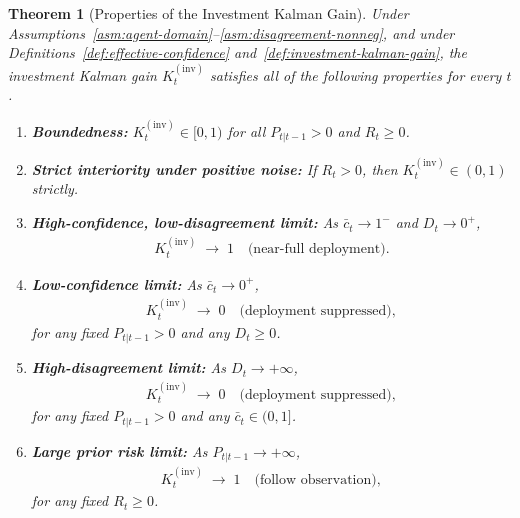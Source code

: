 \documentclass[12pt,openany]{book}
\numberwithin{equation}{chapter}
\theoremstyle{plain}
\newtheorem{theorem}{Theorem}[chapter]
\theoremstyle{definition}
\theoremstyle{remark}
\begin{document}
\begin{theorem}[Properties of the Investment Kalman Gain]
\label{thm:gain-properties}
Under Assumptions~\ref{asm:agent-domain}--\ref{asm:disagreement-nonneg},
and under Definitions~\ref{def:effective-confidence}
and~\ref{def:investment-kalman-gain}, the investment Kalman gain
$K_t^{(\mathrm{inv})}$ satisfies all of the following properties
for every $t$.
\begin{enumerate}
  \item \textbf{Boundedness:}
        $K_t^{(\mathrm{inv})} \in [0,1)$
        for all $P_{t|t-1} > 0$ and $R_t \geq 0$.

  \item \textbf{Strict interiority under positive noise:}
        If $R_t > 0$, then
        $K_t^{(\mathrm{inv})} \in (0,1)$ strictly.

  \item \textbf{High-confidence, low-disagreement limit:}
        As $\bar{c}_t \to 1^{-}$ and $D_t \to 0^{+}$,
        \begin{align}
          K_t^{(\mathrm{inv})} \;\to\; 1
          \quad \text{(near-full deployment)}.
          \label{eq:gain-limit-high-conf}
        \end{align}

  \item \textbf{Low-confidence limit:}
        As $\bar{c}_t \to 0^{+}$,
        \begin{align}
          K_t^{(\mathrm{inv})} \;\to\; 0
          \quad \text{(deployment suppressed)},
          \label{eq:gain-limit-low-conf}
        \end{align}
        for any fixed $P_{t|t-1} > 0$ and any $D_t \geq 0$.

  \item \textbf{High-disagreement limit:}
        As $D_t \to +\infty$,
        \begin{align}
          K_t^{(\mathrm{inv})} \;\to\; 0
          \quad \text{(deployment suppressed)},
          \label{eq:gain-limit-high-disagree}
        \end{align}
        for any fixed $P_{t|t-1} > 0$ and any
        $\bar{c}_t \in (0,1]$.

  \item \textbf{Large prior risk limit:}
        As $P_{t|t-1} \to +\infty$,
        \begin{align}
          K_t^{(\mathrm{inv})} \;\to\; 1
          \quad \text{(follow observation)},
          \label{eq:gain-limit-large-P}
        \end{align}
        for any fixed $R_t \geq 0$.


\end{enumerate}
\end{theorem}
\end{document}
